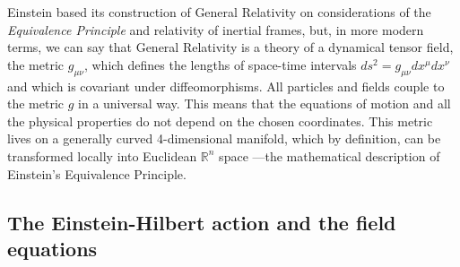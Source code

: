 
Einstein based its construction of General Relativity on considerations of the \emph{Equivalence Principle} and relativity of inertial frames, but, in more modern terms, we can say that General Relativity is a theory of 
a dynamical tensor field, the metric $g_{\mu \nu}$, which defines the lengths 
of space-time intervals $ds^2 = g_{\mu \nu} dx^{\mu} dx^{\nu}$ and which is covariant under diffeomorphisms. 
All particles and fields couple to the metric $g$ in a universal way.
This means that the equations of motion and all the physical properties do not depend on the chosen coordinates. This metric lives on a generally curved 4-dimensional manifold, which by definition, can be transformed
locally into Euclidean $\mathbb{R}^n$ space ---the mathematical description of Einstein's
Equivalence Principle.

\subsection*{The Einstein-Hilbert action and the field equations \label{sub:Einstein-Hilbert}}

